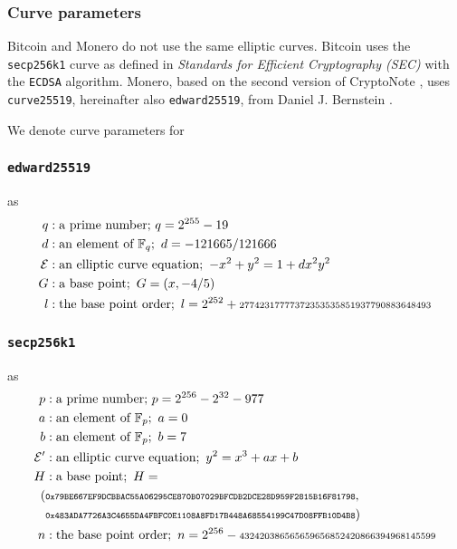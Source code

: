\documentclass{llncs}
\begin{document}
\subsubsection{Curve parameters}
\label{curveParams}
Bitcoin and Monero do not use the same elliptic curves. Bitcoin uses the \texttt{secp256k1} curve as defined in \textit{Standards for Efficient Cryptography (SEC)} with the \texttt{ECDSA} algorithm. Monero, based on the second version of CryptoNote \cite{van2013cryptonote}, uses \texttt{curve25519}, hereinafter also \texttt{edward25519}, from Daniel J. Bernstein \cite{CerRes10}.

We denote curve parameters for

\subsubsection{\texttt{edward25519}} as
\begin{equation}
\begin{split}
    q&: \text{a prime number;}\ q = 2^{255} - 19 \\
    d&: \text{an element of } \mathbb{F}_q;\ d = - 121665/121666 \\
    \mathcal{E}&: \text{an elliptic curve equation};\ -x^2 + y^2 = 1 + dx^2y^2 \\
    G&: \text{a base point};\ G = (x, -4/5) \\
    l&: \text{the base point order};\ l = 2^{252} + \text{\scriptsize27742317777372353535851937790883648493} \\
\end{split}
\end{equation}

\subsubsection{\texttt{secp256k1}} as
\begin{equation}
\begin{split}
    p&: \text{a prime number;}\ p = 2^{256} - 2^{32} - 977 \\
    a&: \text{an element of } \mathbb{F}_p;\ a = 0 \\
    b&: \text{an element of } \mathbb{F}_p;\ b = 7 \\
    \mathcal{E}'&: \text{an elliptic curve equation};\ y^2 = x^3 + ax + b \\
    H&: \text{a base point};\ H = \\ (&\texttt{\scriptsize0x79BE667EF9DCBBAC55A06295CE870B07029BFCDB2DCE28D959F2815B16F81798},\\ &\texttt{\scriptsize0x483ADA7726A3C4655DA4FBFC0E1108A8FD17B448A68554199C47D08FFB10D4B8}) \\
    n&: \text{the base point order};\ n = 2^{256} - \text{\scriptsize{432420386565659656852420866394968145599}} \\
\end{split}
\end{equation}
\end{document}
